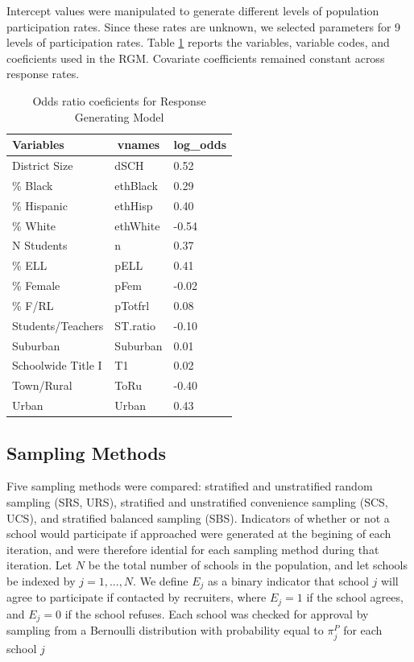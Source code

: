 \documentclass[man,floatsintext]{apa6}
\begin{document}
Intercept values were manipulated to generate different levels of population participation rates. Since these rates are unknown, we selected parameters for 9 levels of participation rates. Table \ref{tab:tab-RGM-Pars} reports the variables, variable codes, and coeficients used in the RGM. Covariate coefficients remained constant across response rates.

\begin{table}[tbp]
\begin{center}
\begin{threeparttable}
\caption{\label{tab:tab-RGM-Pars}Odds ratio coeficients for Response Generating Model}
\begin{tabular}{lll}
\toprule
Variables & \multicolumn{1}{c}{vnames} & \multicolumn{1}{c}{log\_odds}\\
\midrule
District Size & dSCH & 0.52\\
\% Black & ethBlack & 0.29\\
\% Hispanic & ethHisp & 0.40\\
\% White & ethWhite & -0.54\\
N Students & n & 0.37\\
\% ELL & pELL & 0.41\\
\% Female & pFem & -0.02\\
\% F/RL & pTotfrl & 0.08\\
Students/Teachers & ST.ratio & -0.10\\
Suburban & Suburban & 0.01\\
Schoolwide Title I & T1 & 0.02\\
Town/Rural & ToRu & -0.40\\
Urban & Urban & 0.43\\
\bottomrule
\end{tabular}
\end{threeparttable}
\end{center}
\end{table}



\hypertarget{sampling-methods}{%
\subsection{Sampling Methods}\label{sampling-methods}}

Five sampling methods were compared: stratified and unstratified random sampling (SRS, URS), stratified and unstratified convenience sampling (SCS, UCS), and stratified balanced sampling (SBS). Indicators of whether or not a school would participate if approached were generated at the begining of each iteration, and were therefore idential for each sampling method during that iteration. Let \(N\) be the total number of schools in the population, and let schools be indexed by \(j = 1, ..., N\). We define \(E_j\) as a binary indicator that school \(j\) will agree to participate if contacted by recruiters, where \(E_j = 1\) if the school agrees, and \(E_j = 0\) if the school refuses. Each school was checked for approval by sampling from a Bernoulli distribution with probability equal to \(\pi^P_j\) for each school \(j\)
\end{document}
